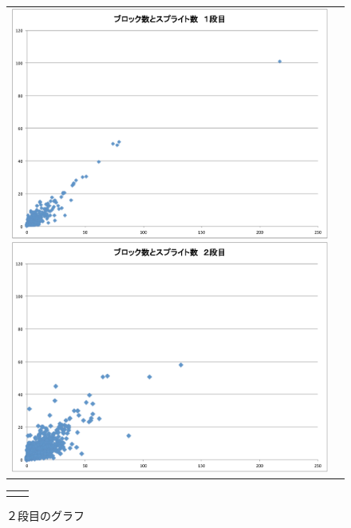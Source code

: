 \documentclass[a4paper,10pt,onecolumn,oneside,openany]{jsbook}
\begin{document}
\begin{figure}[h]
 \begin{tabular}{cc}
 	\begin{minipage}[t]{0.45\hsize}
	 \centering
	 \includegraphics[keepaspectratio, scale = 0.25]{block_splite_1.pdf}
	 \caption{１段目のグラフ}
	 \label{first_block}
	\end{minipage}
        \begin{minipage}[t]{0.45\hsize}
	 \centering
	 \includegraphics[keepaspectratio, scale = 0.25]{block_splite_2.pdf}
	 \caption{２段目のグラフ}
	 \label{second_block}
	\end{minipage}
 \end{tabular}
  \begin{tabular}{cc}
 	\begin{minipage}[t]{0.45\hsize}

\end{minipage}
\end{tabular}
\end{figure}
\end{document}
